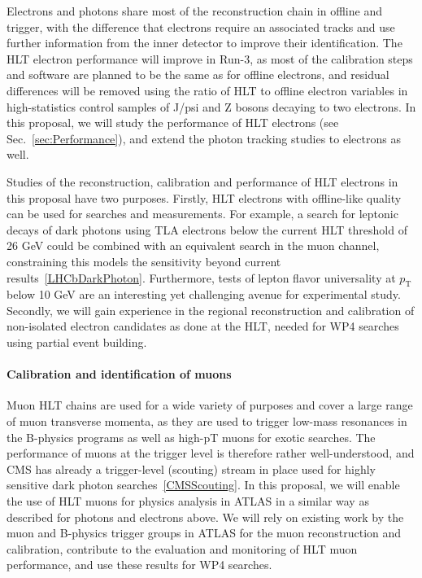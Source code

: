 Electrons and photons share most of the reconstruction chain in offline and trigger, with the difference that electrons require an associated tracks and use further information from the inner detector to improve their identification. The HLT electron performance will improve in Run-3, as most of the calibration steps and software are planned to be the same as for offline electrons, and residual differences will be removed using the ratio of HLT to offline electron variables in high-statistics control samples of J/psi and Z bosons decaying to two electrons. 
In this proposal, we will study the performance of HLT electrons (see Sec.~\ref{sec:Performance}), and extend the photon tracking studies to electrons as well.

Studies of the reconstruction, calibration and performance of HLT electrons in this proposal have two purposes. 
Firstly, HLT electrons with offline-like quality can be used for searches and measurements. For example, a search for leptonic decays of dark photons using TLA electrons below the current HLT threshold of 26 GeV could be combined with an equivalent search in the muon channel, constraining this models the sensitivity beyond current results~\ref{LHCbDarkPhoton}. Furthermore, tests of lepton flavor universality at $p_{\mathrm{T}}$ below 10 GeV are an interesting yet challenging avenue for experimental study. 
Secondly, we will gain experience in the regional reconstruction and calibration of non-isolated electron candidates as done at the HLT, needed for WP4 searches using partial event building. 

\paragraph{Calibration and identification of muons} 

Muon HLT chains are used for a wide variety of purposes and cover a large range of muon transverse momenta, as they are used to trigger low-mass resonances in the B-physics programs as well as high-pT muons for exotic searches. 
The performance of muons at the trigger level is therefore rather well-understood, and CMS has already a trigger-level (scouting) stream in place used for highly sensitive dark photon searches~\ref{CMSScouting}. In this proposal, we will enable the use of HLT muons for physics analysis in ATLAS in a similar way as described for photons and electrons above. We will rely on existing work  by the muon and B-physics trigger groups in ATLAS for the muon reconstruction and calibration, contribute to the evaluation and monitoring of HLT muon performance, and use these results for WP4 searches. 

